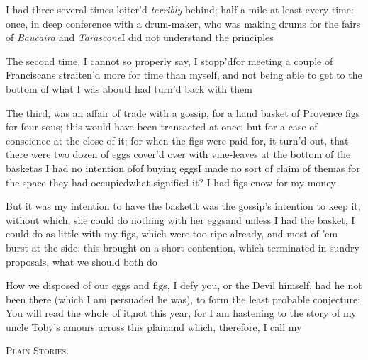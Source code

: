 \documentclass{article}
\begin{document}
I had three several times loiter’d \textit{terribly} behind;
half a mile at least every time: once, in deep conference with a
drum-maker, who was making drums for the fairs of \textit{Baucaira}
and \textit{Tarascone}\tsk I did not understand the
principles\tsh{}

The second time, I cannot so properly say, I
stopp’d\tsh for meeting a couple of
Franciscans straiten’d more for time than myself, and not
being able to get to the bottom of what I was about\tsh I
had turn’d back with them\tsh

The third, was an affair of trade with a gossip, for a
hand basket of Provence figs for four sous; this would have
been transacted at once; but for a case of conscience at the close
of it; for when the figs were paid for, it turn’d out,
that there were two dozen of eggs cover’d over with
vine-leaves at the bottom of the basket\tsk as I had no intention
of\sic\break of buying eggs\tsk I made no sort of claim of them\tsk as for
the space they had occupied\tsk what signified it? I had figs
enow for my money\tsh{}

\tsh But it was my intention to have the basket\tsk it was
the gossip’s intention to keep it, without which, she could
do nothing with her eggs\tsh and unless I had the basket,
I could do as little with my figs, which were too ripe already, and
most of ’em burst at the side: this brought on a short
contention, which terminated in sundry proposals, what we should
both do\tsh

\tsh How we disposed of our eggs and figs, I defy you,
or the Devil himself, had he not been there (which I am persuaded
he was), to form the least probable conjecture: You will read the
whole of it,\break\tsh not this year, for I am hastening to the
story of my uncle Toby’s amours\break
{}
across this plain\tsk and which, therefore, I call
my

\centerline{\textsc{Plain Stories}.}

\smallskip
\end{document}
